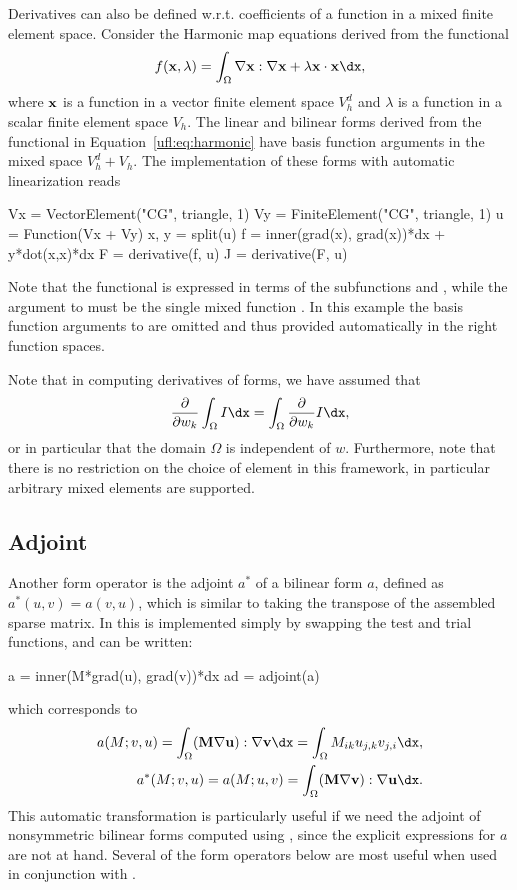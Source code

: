 Derivatives can also be defined w.r.t. coefficients of a function in a
mixed finite element space.  Consider the Harmonic map equations
derived from the functional
\begin{align} \label{ufl:eq:harmonic}
f(\xx, \lambda) = \int_\Omega \nabla \xx : \nabla \xx + \lambda \xx\cdot\xx \dx,
\end{align}
where $\mathbf{x}$ is a function in a vector finite element space $V_h^d$ and
$\lambda$ is a function in a scalar finite element space $V_h$.  The
linear and bilinear forms derived from the functional in
Equation~\ref{ufl:eq:harmonic} have basis function arguments in the
mixed space $V_h^d + V_h$.  The implementation of these forms with
automatic linearization reads
\begin{code}
Vx = VectorElement("CG", triangle, 1)
Vy = FiniteElement("CG", triangle, 1)
u = Function(Vx + Vy)
x, y = split(u)
f = inner(grad(x), grad(x))*dx + y*dot(x,x)*dx
F = derivative(f, u)
J = derivative(F, u)
\end{code}
Note that the functional is expressed in terms of the subfunctions
 and , while the argument to  must
be the single mixed function .  In this example the basis
function arguments to  are omitted and thus provided
automatically in the right function spaces.

Note that in computing derivatives of forms, we have assumed that
\begin{align}
\frac{\partial}{\partial w_k} \int_\Omega I \dx
= \int_\Omega \frac{\partial}{\partial w_k} I \dx,
\end{align}
or in particular that the domain $\Omega$ is independent of $w$.
Furthermore, note that there is no restriction on the choice of
element in this framework, in particular arbitrary mixed elements are
supported.

\subsection{Adjoint}
\label{ufl:sec:adjoint}

Another form operator is the adjoint $a^*$ of a bilinear form $a$,
defined as $a^*(u,v) = a(v,u)$, which is similar to taking the
transpose of the assembled sparse matrix.  In \ufl{} this is
implemented simply by swapping the test and trial functions, and can
be written:
\begin{code}
a = inner(M*grad(u), grad(v))*dx
ad = adjoint(a)
\end{code}
which corresponds to
\begin{align}
a(M; v, u) = \int_\Omega (\MM\nabla \uu) : \nabla \vv \dx = \int_\Omega M_{ik}u_{j,k}v_{j,i}\dx, \\
a^*(M; v, u) = a(M; u, v) = \int_\Omega (\MM\nabla \vv) : \nabla \uu \dx.
\end{align}
This automatic transformation is particularly useful if we need the
adjoint of nonsymmetric bilinear forms computed using
, since the explicit expressions for $a$ are not at
hand.  Several of the form operators below are most useful when used
in conjunction with .

